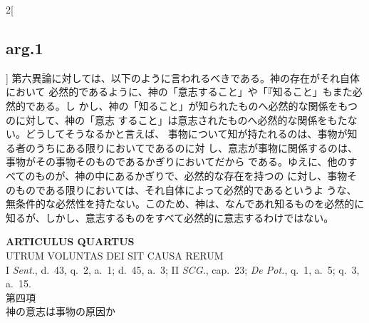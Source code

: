 \documentclass[paper=a4paper,fontsize=10pt,jafontsize=9pt,titlepage]{jlreq}
\begin{document}
\begin{paracol}{2}[\subsection{arg.1}]
第六異論に対しては、以下のように言われるべきである。神の存在がそれ自体において
 必然的であるように、神の「意志すること」や「『知ること」もまた必然的である。し
 かし、神の「知ること」が知られたものへ必然的な関係をもつのに対して、神の「意志
 すること」は意志されたものへ必然的な関係をもたない。どうしてそうなるかと言えば、
 事物について知が持たれるのは、事物が知る者のうちにある限りにおいてであるのに対
 し、意志が事物に関係するのは、事物がその事物そのものであるかぎりにおいてだから
 である。ゆえに、他のすべてのものが、神の中にあるかぎりで、必然的な存在を持つの
 に対し、事物そのものである限りにおいては、それ自体によって必然的であるというよ
 うな、無条件的な必然性を持たない。このため、神は、なんであれ知るものを必然的に
 知るが、しかし、意志するものをすべて必然的に意志するわけではない。

\end{paracol}
\newpage




{}
\setcounter{section}{4}
\setcounter{subsection}{0}
\begin{center}
 {\Large {\bfseries ARTICULUS QUARTUS}}\\
 {\large UTRUM VOLUNTAS DEI SIT CAUSA RERUM}\\
 {\footnotesize I {\itshape Sent.}, d.~43, q.~2, a.~1; d.~45, a.~3; II
 {\itshape SCG.}, cap.~23; {\itshape De Pot.}, q.~1, a.~5; q.~3, a.~15.}\\
 {\Large 第四項\\神の意志は事物の原因か}
\end{center}
\end{document}
